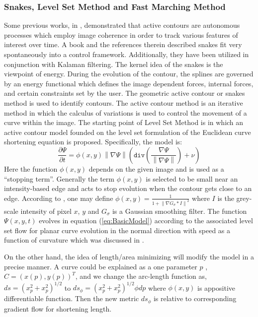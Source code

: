 \documentclass[letterpaper, 10 pt, conference]{ieeeconf}  %
\begin{document}
\subsubsection{Snakes, Level Set Method and Fast Marching Method}
Some previous works, in \cite{betser2004automatic}\cite{sattigeri2007vision}, demonstrated that active contours are autonomous processes which employ image coherence in order to track various features of interest over time. A book \cite{blake1998active} and the references therein described snakes fit very spontaneously into a control framework. Additionally, they have been utilized in conjunction with Kalaman filtering. The kernel idea of the snakes is the viewpoint of energy. During the evolution of the contour, the splines are governed by an energy functional which defines the image dependent forces, internal forces, and certain constraints set by the user. The geometric active contour or snakes method is used to identify contours. The active contour method is an iterative method in which the calculus of variations is used to control the movement of a curve within the image. 
The starting point of Level Set Method is \cite{368173}\cite{Caselles1993} in which an active contour model founded on the level set formulation of the Euclidean curve shortening equation is proposed. Specifically, the model is:
\begin{equation} \label{eq:BasicModel}
\frac{\partial \Psi}{\partial t} = \phi(x,y) \left\|\nabla\Psi\right\| (\texttt{div}(\frac{\nabla \Psi}{\left\|\nabla\Psi\right\|})+\nu) 
\end{equation}
Here the function $ \phi(x,y) $ depends on the given image and is used as a ``stopping term''. Generally the term  $ \phi(x,y) $ is selected to be small near an intensity-based edge and acts to stop evolution when the contour gets close to an edge. According to \cite{368173}\cite{Caselles1993}, one may define $\phi(x,y) = \frac{1}{1 + \left\| \nabla G_{\sigma} \ast I \right\|^2 }$ where $I$  is the grey-scale intensity of pixel $x$, $y$ and $ G_{\sigma} $  is a Gaussian smoothing filter.  The function  $ \Psi(x,y,t)  $ evolves in equation (\ref{eq:BasicModel}) according to the associated level set flow for planar curve evolution in the normal direction with speed as a function of curvature which was discussed in \cite{sethian1985curvature}\cite{osher1988fronts}. 

On the other hand, the idea of length/area minimizing will modify the model in a precise manner. A curve could be explained as a one parameter $p$ , $C=(x(p),y(p))^T$, and we change the arc-length function as, $ds = (x_p^2 + x_p^2)^{1/2}$ to $ds_\phi = (x_p^2 + x_p^2)^{1/2} \phi dp$ where $\phi(x,y)$  is appositive differentiable function. Then the new metric $ ds_\phi$ is relative to corresponding gradient flow for shortening length.
\end{document}
